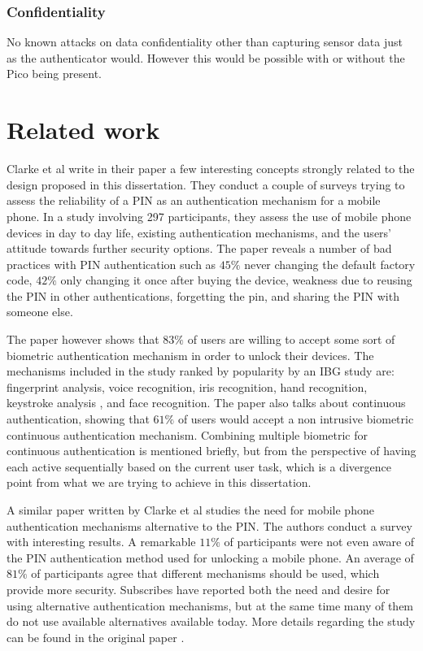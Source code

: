 	\subsubsection*{Confidentiality}
	No known attacks on data confidentiality other than capturing sensor data just as the authenticator would. However this would be possible with or without the Pico being present.

\section{Related work}
Clarke et al write in their paper \cite{clarke2005authentication} a few interesting concepts strongly related to the design proposed in this dissertation. They conduct a couple of surveys trying to assess the reliability of a PIN as an authentication mechanism for a mobile phone. In a study involving 297 participants, they assess the use of mobile phone devices in day to day life, existing authentication mechanisms, and the users' attitude towards further security options. The paper reveals a number of bad practices with PIN authentication such as $45\%$ never changing the default factory code, $42\%$ only changing it once after buying the device, weakness due to reusing the PIN in other authentications, forgetting the pin, and sharing the PIN with someone else.

The paper \cite{clarke2005authentication} however shows that $83\%$ of users are willing to accept some sort of biometric authentication mechanism in order to unlock their devices. The mechanisms included in the study ranked by popularity by an IBG study \cite{} are: fingerprint analysis, voice recognition, iris recognition, hand recognition, keystroke analysis \cite{clarke2003using}, and face recognition. The paper also talks about continuous authentication, showing that $61\%$ of users would accept a non intrusive biometric continuous authentication mechanism. Combining multiple biometric for continuous authentication is mentioned briefly, but from the perspective of having each active sequentially based on the current user task, which is a divergence point from what we are trying to achieve in this dissertation.

A similar paper \cite{clarke2002acceptance} written by Clarke et al studies the need for mobile phone authentication mechanisms alternative to the PIN. The authors conduct a survey with interesting results. A remarkable $11\%$ of participants were not even aware of the PIN authentication method used for unlocking a mobile phone. An average of $81\%$ of participants agree that different mechanisms should be used, which provide more security. Subscribes have reported both the need and desire for using alternative authentication mechanisms, but at the same time many of them do not use available alternatives available today. More details regarding the study can be found in the original paper \cite{clarke2002acceptance}.

